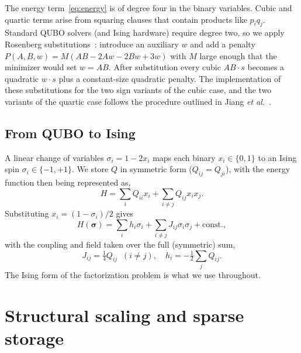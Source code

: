 \documentclass[reprint,twocolumn,amsmath,amssymb,nofootinbib]{revtex4-2}
\begin{document}
The energy term~\eqref{eq:energy} is of degree four in the binary variables. Cubic and quartic terms arise from squaring clauses that contain products like $p_i q_j$. Standard QUBO solvers (and Ising hardware) require degree two, so we apply Rosenberg substitutions~\cite{Rosenberg1975}: introduce an auxiliary $w$ and add a penalty $P(A,B,w) = M(AB - 2Aw - 2Bw + 3w)$ with $M$ large enough that the minimizer would set $w = AB$. After substitution every cubic $AB \cdot s$ becomes a quadratic $w \cdot s$ plus a constant-size quadratic penalty. The implementation of these substitutions for the two sign variants of the cubic case, and the two variants of the quartic case follows the procedure outlined in Jiang \emph{et al.}~\cite{Jiang2018}.

\subsection{From QUBO to Ising}\label{sec:qubotoising}

A linear change of variables $\sigma_i = 1 - 2 x_i$ maps each binary $x_i \in \{0,1\}$ to an Ising spin $\sigma_i \in \{-1, +1\}$. We store $Q$ in symmetric form ($Q_{ij} = Q_{ji}$), with the energy function then being represented as,
\begin{equation}
  H = \sum_i Q_{ii} x_i + \sum_{i \neq j} Q_{ij} x_i x_j.
\end{equation}
Substituting $x_i = (1 - \sigma_i)/2$ gives
\begin{equation}
  H(\boldsymbol\sigma) = \sum_i h_i \sigma_i
                      + \sum_{i \neq j} J_{ij} \sigma_i \sigma_j
                      + \text{const.},
\end{equation}
with the coupling and field taken over the full (symmetric) sum,
\begin{equation}
  J_{ij} = \tfrac{1}{4} Q_{ij} \;\; (i \neq j), \quad
  h_i    = -\tfrac{1}{2} \sum_{j} Q_{ij}.
\end{equation}
The Ising form of the factorization problem is what we use throughout.

\section{Structural scaling and sparse storage}\label{sec:scaling}
\end{document}
